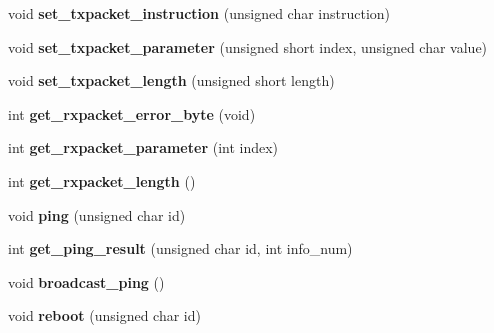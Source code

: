 \begin{DoxyCompactItemize}
\item 
\hypertarget{classdynamixel2_a86ac906e5b548649510366ca978aed05}{}void {\bfseries set\+\_\+txpacket\+\_\+instruction} (unsigned char instruction)\label{classdynamixel2_a86ac906e5b548649510366ca978aed05}

\item 
\hypertarget{classdynamixel2_a4737bc55c853cedb5102d5c38ab1a1b5}{}void {\bfseries set\+\_\+txpacket\+\_\+parameter} (unsigned short index, unsigned char value)\label{classdynamixel2_a4737bc55c853cedb5102d5c38ab1a1b5}

\item 
\hypertarget{classdynamixel2_a2831a22a03d36e4590c9ad368efa10cf}{}void {\bfseries set\+\_\+txpacket\+\_\+length} (unsigned short length)\label{classdynamixel2_a2831a22a03d36e4590c9ad368efa10cf}

\item 
\hypertarget{classdynamixel2_a0de7ef4de89f220945b9b9028c24796f}{}int {\bfseries get\+\_\+rxpacket\+\_\+error\+\_\+byte} (void)\label{classdynamixel2_a0de7ef4de89f220945b9b9028c24796f}

\item 
\hypertarget{classdynamixel2_a16298831a1f2430bc9d7fc826d8c5dfd}{}int {\bfseries get\+\_\+rxpacket\+\_\+parameter} (int index)\label{classdynamixel2_a16298831a1f2430bc9d7fc826d8c5dfd}

\item 
\hypertarget{classdynamixel2_a70ada371be989aacab473e81cc002156}{}int {\bfseries get\+\_\+rxpacket\+\_\+length} ()\label{classdynamixel2_a70ada371be989aacab473e81cc002156}

\item 
\hypertarget{classdynamixel2_abf94a0932647959fff04aed5c6708f79}{}void {\bfseries ping} (unsigned char id)\label{classdynamixel2_abf94a0932647959fff04aed5c6708f79}

\item 
\hypertarget{classdynamixel2_a13fcec580551a263fcb4e4aad311ace0}{}int {\bfseries get\+\_\+ping\+\_\+result} (unsigned char id, int info\+\_\+num)\label{classdynamixel2_a13fcec580551a263fcb4e4aad311ace0}

\item 
\hypertarget{classdynamixel2_a79993ea3bc2230635d9e3d9e2f9ec27c}{}void {\bfseries broadcast\+\_\+ping} ()\label{classdynamixel2_a79993ea3bc2230635d9e3d9e2f9ec27c}

\item 
\hypertarget{classdynamixel2_a674ea4cce4a1f807c0749ac7eb685cd6}{}void {\bfseries reboot} (unsigned char id)\label{classdynamixel2_a674ea4cce4a1f807c0749ac7eb685cd6}


\end{DoxyCompactItemize}
